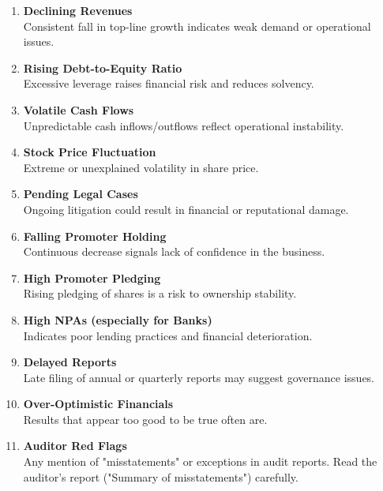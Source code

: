 \documentclass[12pt]{article}
\begin{document}
\begin{enumerate}
    \item \textbf{Declining Revenues} \\
    Consistent fall in top-line growth indicates weak demand or operational issues.
    
    \item \textbf{Rising Debt-to-Equity Ratio} \\
    Excessive leverage raises financial risk and reduces solvency.
    
    \item \textbf{Volatile Cash Flows} \\
    Unpredictable cash inflows/outflows reflect operational instability.
    
    \item \textbf{Stock Price Fluctuation} \\
    Extreme or unexplained volatility in share price.
    
    \item \textbf{Pending Legal Cases} \\
    Ongoing litigation could result in financial or reputational damage.
    
    \item \textbf{Falling Promoter Holding} \\
    Continuous decrease signals lack of confidence in the business.
    
    \item \textbf{High Promoter Pledging} \\
    Rising pledging of shares is a risk to ownership stability.
    
    \item \textbf{High NPAs (especially for Banks)} \\
    Indicates poor lending practices and financial deterioration.
    
    \item \textbf{Delayed Reports} \\
    Late filing of annual or quarterly reports may suggest governance issues.
    
    \item \textbf{Over-Optimistic Financials} \\
    Results that appear too good to be true often are.
    
    \item \textbf{Auditor Red Flags} \\
    Any mention of "misstatements" or exceptions in audit reports. Read the auditor's report ("Summary of misstatements") carefully.
    

\end{enumerate}
\end{document}
